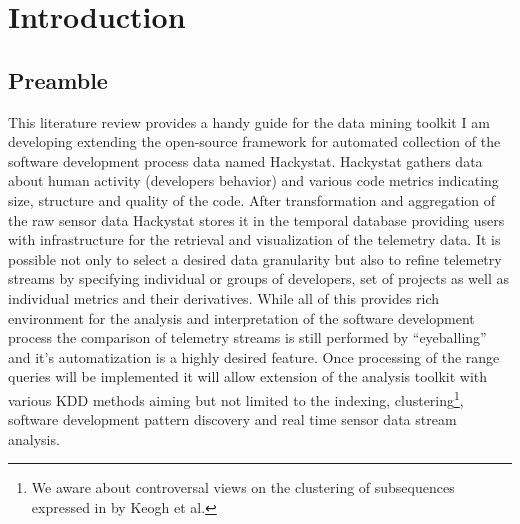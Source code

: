 \chapter{Introduction}
\section{Preamble}
This literature review provides a handy guide for the data mining toolkit I am developing extending the open-source framework for automated collection of the software development process data named Hackystat. Hackystat gathers data about human activity (developers behavior) and various code metrics indicating size, structure and quality of the code. After transformation and aggregation of the raw sensor data Hackystat stores it in the temporal database providing users with infrastructure for the retrieval and visualization of the telemetry data. It is possible not only to select a desired data granularity but also to refine telemetry streams by specifying individual or groups of developers, set of projects as well as individual metrics and their derivatives. While all of this provides rich environment for the analysis and interpretation of the software development process the comparison of telemetry streams is still performed by ``eyeballing'' and it's automatization is a highly desired feature. Once processing of the range queries will be implemented it will allow extension of the analysis toolkit with various KDD methods aiming but not limited to the indexing, clustering\footnote{We aware about controversal views on the clustering of subsequences expressed in \cite{citeulike:227029} by Keogh et al.}, software development pattern discovery and real time sensor data stream analysis.

